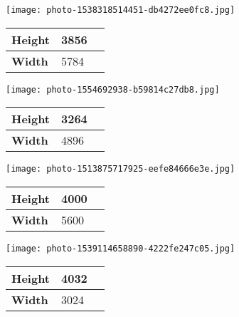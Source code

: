 \documentclass{article}
\begin{document}
\begin{center}
  \texttt{[image: photo-1538318514451-db4272ee0fc8.jpg]}

\begin{table}[ht]
\begin{tabular}{|M{6.8cm}|M{6.8cm}|N}
\hline
\textbf{Height} & 3856 &\\[20pt]
\hline
\textbf{Width} & 5784 &\\[20pt]
\hline
\end{tabular}
\end{table}


\end{center}

\begin{center}
  \texttt{[image: photo-1554692938-b59814c27db8.jpg]}

\begin{table}[ht]
\begin{tabular}{|M{6.8cm}|M{6.8cm}|N}
\hline
\textbf{Height} & 3264 &\\[20pt]
\hline
\textbf{Width} & 4896 &\\[20pt]
\hline
\end{tabular}
\end{table}


\end{center}

\begin{center}
  \texttt{[image: photo-1513875717925-eefe84666e3e.jpg]}

\begin{table}[ht]
\begin{tabular}{|M{6.8cm}|M{6.8cm}|N}
\hline
\textbf{Height} & 4000 &\\[20pt]
\hline
\textbf{Width} & 5600 &\\[20pt]
\hline
\end{tabular}
\end{table}


\end{center}

\begin{center}
  \texttt{[image: photo-1539114658890-4222fe247c05.jpg]}

\begin{table}[ht]
\begin{tabular}{|M{6.8cm}|M{6.8cm}|N}
\hline
\textbf{Height} & 4032 &\\[20pt]
\hline
\textbf{Width} & 3024 &\\[20pt]
\hline
\end{tabular}
\end{table}


\end{center}
\end{document}
